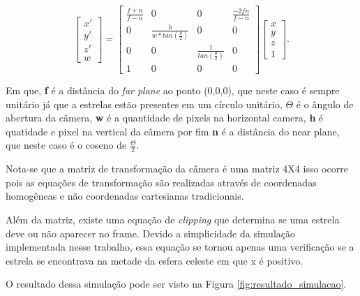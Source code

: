 \begin{equation}
    \begin{bmatrix}
        x' \\
        y' \\
        z' \\
        w
    \end{bmatrix}
    =
    \begin{bmatrix}
        \frac{f+n}{f-n} & 0                                 & 0                               & \frac{-2fn}{f-n} \\
        0               & \frac{h}{w*tan(\frac{\theta}{2})} & 0                               & 0                \\
        0               & 0                                 & \frac{1}{tan(\frac{\theta}{2})} & 0                \\
        1               & 0                                 & 0                               & 0
    \end{bmatrix}
    \begin{bmatrix}
        x \\
        y \\
        z \\
        1
    \end{bmatrix}.
\end{equation}

Em que, \textbf{f} é a distância do \textit{far plane} ao ponto (0,0,0), 
que neste caso é sempre unitário já que a estrelas estão presentes em um círculo unitário, $\Theta$ é o ângulo de abertura  da câmera, \textbf{w} é a quantidade de pixels na horizontal camera, \textbf{h} é quatidade e pixel na vertical da câmera por fim \textbf{n} é a distância do near plane, que neste caso é o coseno de $\frac{\Theta}{2}$.

Nota-se que a matriz de transformação da câmera é uma matriz 4X4 isso ocorre pois as equações de transformação são realizadas através de coordenadas homogêneas e não coordenadas cartesianas tradicionais.

Além da matriz, existe uma equação de \textit{clipping} que determina se uma estrela deve ou não aparecer no frame. 
Devido a simplicidade da simulação implementada nesse trabalho, 
essa equação se tornou apenas uma verificação se a estrela se encontrava na metade da esfera celeste em que x é positivo.

O resultado dessa simulação pode ser visto na Figura \ref{fig:resultado_simulacao}.

